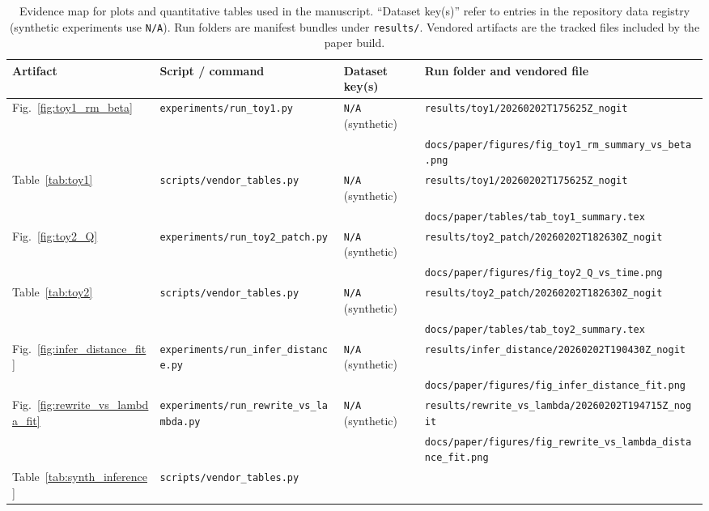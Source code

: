 \documentclass[11pt]{article}
\theoremstyle{definition}
\theoremstyle{plain}
\theoremstyle{remark}
\begin{document}
\begin{landscape}
\begin{table}[p]
\centering
\footnotesize
\caption{Evidence map for plots and quantitative tables used in the manuscript. ``Dataset key(s)'' refer to entries in the repository data registry (synthetic experiments use \texttt{N/A}). Run folders are manifest bundles under \texttt{results/}. Vendored artifacts are the tracked files included by the paper build.}
\label{tab:evidence_map}
\begin{tabular}{@{}llll@{}}
\toprule
Artifact & Script / command & Dataset key(s) & Run folder and vendored file \\
\midrule
Fig.~\ref{fig:toy1_rm_beta} &
\texttt{experiments/run\_toy1.py} &
\texttt{N/A} (synthetic) &
\texttt{results/toy1/20260202T175625Z\_nogit} \\
& & &
\texttt{docs/paper/figures/fig\_toy1\_rm\_summary\_vs\_beta.png} \\[2pt]
Table~\ref{tab:toy1} &
\texttt{scripts/vendor\_tables.py} &
\texttt{N/A} (synthetic) &
\texttt{results/toy1/20260202T175625Z\_nogit} \\
& & &
\texttt{docs/paper/tables/tab\_toy1\_summary.tex} \\
\midrule
Fig.~\ref{fig:toy2_Q} &
\texttt{experiments/run\_toy2\_patch.py} &
\texttt{N/A} (synthetic) &
\texttt{results/toy2\_patch/20260202T182630Z\_nogit} \\
& & &
\texttt{docs/paper/figures/fig\_toy2\_Q\_vs\_time.png} \\[2pt]
Table~\ref{tab:toy2} &
\texttt{scripts/vendor\_tables.py} &
\texttt{N/A} (synthetic) &
\texttt{results/toy2\_patch/20260202T182630Z\_nogit} \\
& & &
\texttt{docs/paper/tables/tab\_toy2\_summary.tex} \\
\midrule
Fig.~\ref{fig:infer_distance_fit} &
\texttt{experiments/run\_infer\_distance.py} &
\texttt{N/A} (synthetic) &
\texttt{results/infer\_distance/20260202T190430Z\_nogit} \\
& & &
\texttt{docs/paper/figures/fig\_infer\_distance\_fit.png} \\[2pt]
Fig.~\ref{fig:rewrite_vs_lambda_fit} &
\texttt{experiments/run\_rewrite\_vs\_lambda.py} &
\texttt{N/A} (synthetic) &
\texttt{results/rewrite\_vs\_lambda/20260202T194715Z\_nogit} \\
& & &
\texttt{docs/paper/figures/fig\_rewrite\_vs\_lambda\_distance\_fit.png} \\[2pt]
Table~\ref{tab:synth_inference} &
\texttt{scripts/vendor\_tables.py} &

\end{tabular}
\end{table}
\end{landscape}
\end{document}
